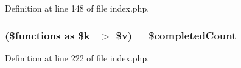 Definition at line 148 of file index.\-php.

\hypertarget{index_8php_a1b77627b646134ac307a24cf90261ebb}{
\subsubsection[{foreach}]{(\$functions as \$k=$>$ \$v) = \$completed\-Count}}\label{index_8php_a1b77627b646134ac307a24cf90261ebb}


Definition at line 222 of file index.\-php.

